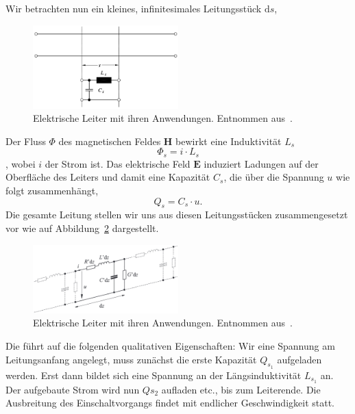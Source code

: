 \documentclass[paper=a4, parskip=half-, ngerman, fontsize=11pt]{scrreprt}
\begin{document}
Wir betrachten nun ein kleines, infinitesimales Leitungsstück $\mathrm{d}s$,
\begin{figure}[!h]
    \begin{center}
        \includegraphics[width=0.5\textwidth]{images/Leitung1.png}
        \caption{Elektrische Leiter mit ihren Anwendungen. Entnommen aus~\cite{LeitungenUndFilter}.}
        \label{Leitung1}
    \end{center}
\end{figure}

Der Fluss $\Phi$ des magnetischen Feldes $\textbf{H}$ bewirkt eine Induktivität $L_{s}$
\[ \Phi_{s} = i \cdot L_{s} \], wobei $i$ der Strom ist.
Das elektrische Feld $\textbf{E}$ induziert Ladungen auf der Oberfläche des Leiters und damit eine Kapazität $C_{s}$,
die über die Spannung $u$ wie folgt zusammenhängt,
\[ Q_{s} = C_{s} \cdot u . \]
Die gesamte Leitung stellen wir uns aus diesen Leitungsstücken zusammengesetzt vor wie auf Abbildung~\ref{Leitung2}
dargestellt.
\begin{figure}[!h]
    \begin{center}
        \includegraphics[width=0.5\textwidth]{images/Leitung2.png}
        \caption{Elektrische Leiter mit ihren Anwendungen. Entnommen aus~\cite{LeitungenUndFilter}.}
        \label{Leitung2}
    \end{center}
\end{figure}
Die führt auf die folgenden qualitativen Eigenschaften: Wir eine Spannung am Leitungsanfang angelegt, muss zunächst die
erste Kapazität $Q_{s_{1}}$ aufgeladen werden. Erst dann bildet sich eine Spannung an der Längsinduktivität $L_{s_{1}}$
an. Der aufgebaute Strom wird nun $Q{s_{2}}$ aufladen etc., bis zum Leiterende. Die Ausbreitung des Einschaltvorgangs
findet mit endlicher Geschwindigkeit statt.
\end{document}

